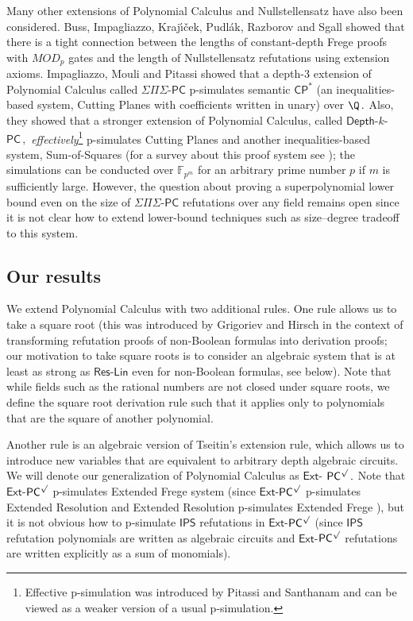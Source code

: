 \documentclass{toc}
\begin{document}
Many other extensions of Polynomial Calculus and Nullstellensatz have
%
also been considered.  %
Buss, Impagliazzo, Kraj{\'{\i}}{\v{c}}ek, Pudl{\'{a}}k, Razborov and Sgall \cite{BussIKPRS96} showed that there is a  tight connection between the lengths of constant-depth Frege  %
proofs with $MOD_p$ gates and the length of Nullstellensatz refutations using extension axioms. Impagliazzo,  Mouli and Pitassi \cite{IMP19_new} showed that a depth-3 extension of Polynomial Calculus called $\Sigma\Pi\Sigma$-$\mathsf{PC}$ p-simulates semantic $\mathsf{CP}^*$ (an inequalities-based system, Cutting Planes \cite{CCT87, CHVATAL1989455} with coefficients written in unary) over %
$\Q\,.$ %
 Also, they showed that a stronger extension of Polynomial Calculus, called $\mathsf{Depth}$-$k$-%
$\mathsf{PC}\,,$ %
 \textit{effectively}\footnote{Effective p-simulation was %
introduced  %
by Pitassi and Santhanam \cite{PS10}  and can be viewed as a weaker version of a usual p-simulation.} p-simulates Cutting Planes and another inequalities-based system, 
%
Sum-of-Squares   %
(for %
a   %
survey about this proof system see \cite{DBLP:journals/eccc/FlemingKP19}); the simulations can be conducted over $\mathbb{F}_{p^m}$ for an arbitrary prime number $p$ if $m$ is sufficiently large. However, the question about proving a %
superpolynomial 
%
lower bound even on the size of $\Sigma\Pi\Sigma$-$\mathsf{PC}$ refutations over any field remains open since it is not clear how
to extend %
lower-bound techniques  %
such as %
size--degree   %
tradeoff to this system.



\subsection{Our results}
We extend Polynomial Calculus with two additional rules. One rule allows us to take a square root
%
(this was  %
introduced by Grigoriev and Hirsch \cite{GH03} in the context of transforming refutation proofs of non-Boolean formulas into derivation proofs; our motivation to take square roots is to consider an algebraic system that is at least as strong as $\mathsf{Res}$-$\mathsf{Lin}$ even for non-Boolean formulas, see below).  %
Note that while fields such as the rational numbers are not closed under square roots, we define the square root derivation rule such that it applies only to polynomials that are the square of another polynomial. %

Another rule is an algebraic version of Tseitin's extension rule, which allows us to introduce new variables that are equivalent to arbitrary depth algebraic circuits. We will denote our generalization of Polynomial Calculus as $\mathsf{Ext}$-%
$\mathsf{PC}^{\surd}\,.$ %
 Note that $\mathsf{Ext}$-$\mathsf{PC}^{\surd}$ p-simulates Extended Frege system (since $\mathsf{Ext}$-$\mathsf{PC}^{\surd}$ p-simulates Extended Resolution and Extended Resolution p-simulates Extended Frege \cite{KP89}), but %
it is %
not obvious how to p-simulate $\mathsf{IPS}$ refutations in $\mathsf{Ext}$-$\mathsf{PC}^{\surd}$ (since $\mathsf{IPS}$ %
refutation  %
%
polynomials are written as algebraic circuits and $\mathsf{Ext}$-$\mathsf{PC}^{\surd}$ refutations are written explicitly as a sum of monomials).
\end{document}
